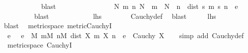 \begin{isabellebody}
\ \ \ \ \ \ \ \ \ \ \isamarkupfalse%
\ blast\isanewline
\ \ \ \ \ \ \isacommand{{\isacharbraceright}{\kern0pt}}\isamarkupfalse%
\isanewline
\ \ \ \ \ \ \isamarkupfalse%
\ \isamarkupfalse%
\ {\isachardoublequoteopen}{\isasymexists}N{\isachardot}{\kern0pt}\ {\isasymforall}m\ n{\isachardot}{\kern0pt}\ N\ {\isasymle}\ m\ {\isasymand}\ N\ {\isasymle}\ n\ {\isasymlongrightarrow}\ dist\ {\isacharparenleft}{\kern0pt}s\ m{\isacharparenright}{\kern0pt}\ {\isacharparenleft}{\kern0pt}s\ n{\isacharparenright}{\kern0pt}\ {\isacharless}{\kern0pt}\ e{\isachardoublequoteclose}\isanewline
\ \ \ \ \ \ \ \ \isamarkupfalse%
\ blast\isanewline
\ \ \ \ \isacommand{{\isacharbraceright}{\kern0pt}}\isamarkupfalse%
\isanewline
\ \ \ \ \isamarkupfalse%
\ \isamarkupfalse%
\ {\isacharquery}{\kern0pt}lhs\isanewline
\ \ \ \ \ \ \isamarkupfalse%
\ Cauchy{\isacharunderscore}{\kern0pt}def\ \isamarkupfalse%
\ blast\isanewline
\ \ \isamarkupfalse%
\ \isamarkupfalse%
\ {\isacharquery}{\kern0pt}lhs\isanewline
\ \ \ \ \isamarkupfalse%
\ blast\isanewline
{}\isamarkupfalse%
%
\endisatagproof
{\isafoldproof}%
%
\isadelimproof
\isanewline
%
\endisadelimproof
\isanewline
{}\isamarkupfalse%
\ {\isacharparenleft}{\kern0pt}\ metric{\isacharunderscore}{\kern0pt}space{\isacharparenright}{\kern0pt}\ metric{\isacharunderscore}{\kern0pt}CauchyI{\isacharcolon}{\kern0pt}\isanewline
\ \ {\isachardoublequoteopen}{\isacharparenleft}{\kern0pt}{\isasymAnd}e{\isachardot}{\kern0pt}\ {}\ {\isacharless}{\kern0pt}\ e\ {\isasymLongrightarrow}\ {\isasymexists}M{\isachardot}{\kern0pt}\ {\isasymforall}m{\isasymge}M{\isachardot}{\kern0pt}\ {\isasymforall}n{\isasymge}M{\isachardot}{\kern0pt}\ dist\ {\isacharparenleft}{\kern0pt}X\ m{\isacharparenright}{\kern0pt}\ {\isacharparenleft}{\kern0pt}X\ n{\isacharparenright}{\kern0pt}\ {\isacharless}{\kern0pt}\ e{\isacharparenright}{\kern0pt}\ {\isasymLongrightarrow}\ Cauchy\ X{\isachardoublequoteclose}\isanewline
%
\isadelimproof
\ \ %
\endisadelimproof
%
\isatagproof
{}\isamarkupfalse%
\ {\isacharparenleft}{\kern0pt}simp\ add{\isacharcolon}{\kern0pt}\ Cauchy{\isacharunderscore}{\kern0pt}def{\isacharparenright}{\kern0pt}%
\endisatagproof
{\isafoldproof}%
%
\isadelimproof
\isanewline
%
\endisadelimproof
\isanewline
{}\isamarkupfalse%
\ {\isacharparenleft}{\kern0pt}\ metric{\isacharunderscore}{\kern0pt}space{\isacharparenright}{\kern0pt}\ CauchyI{\isacharprime}{\kern0pt}{\isacharcolon}{\kern0pt}\isanewline

\end{isabellebody}
